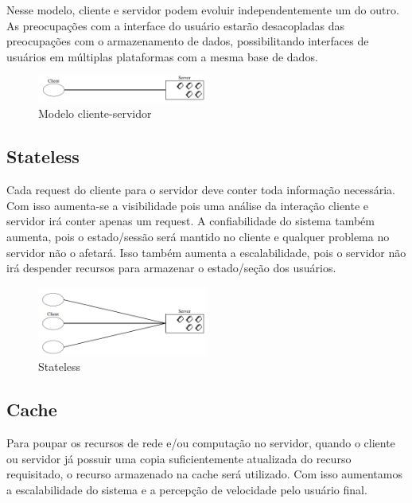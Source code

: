 Nesse modelo, cliente e servidor podem evoluir independentemente um do outro. As preocupações com a interface do usuário estarão desacopladas das preocupações com o armazenamento de dados, possibilitando interfaces de usuários em múltiplas plataformas com a mesma base de dados.

\begin{figure}[ht]
\centering
\includegraphics[width=0.5\textwidth]{Cap1/rest_client_server}
\caption{Modelo cliente-servidor}
\label{rest_client_server}
\end{figure}

\subsection{Stateless}

Cada request do cliente para o servidor deve conter toda informação necessária. Com isso aumenta-se a  visibilidade pois uma análise da interação cliente e servidor irá conter apenas um request. A confiabilidade do sistema também aumenta, pois o estado/sessão será mantido no cliente e qualquer problema no servidor não o afetará. Isso também aumenta a escalabilidade, pois o servidor não irá despender recursos para armazenar o estado/seção dos usuários.

\begin{figure}[ht]
\centering
\includegraphics[width=0.5\textwidth]{Cap1/rest_stateless}
\caption{Stateless}
\label{rest_stateless}
\end{figure}

\subsection{Cache}

Para poupar os recursos de rede e/ou computação no servidor, quando o cliente ou servidor já possuir uma copia suficientemente atualizada do recurso requisitado, o recurso armazenado na cache será utilizado. Com isso aumentamos a escalabilidade do sistema e a percepção de velocidade pelo usuário final.

